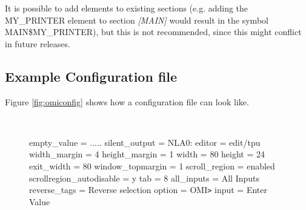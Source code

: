 \documentclass[a4paper]{book}
\newcommand{\vs}{\vspace{3mm}}
\newcommand{\gt}{\texttt{>}}
\renewcommand{\indent}{\hspace*{5mm}}
\begin{document}
\vs

It is possible to add elements to existing sections (e.g. adding the 
\linebreak MY{\_}PRINTER element to section \textsl{[MAIN]} would 
result in the symbol \linebreak MAIN{\$}MY{\_}PRINTER), but this is not recommended,
since this might conflict in future releases.

\subsection{Example Configuration file}
\label{subsubsec:example}

Figure \ref{fig:omiconfig} shows how a configuration file can look like.

\begin{figure}[ht]
\begin{minipage}[t]{\textwidth}
\hrulefill \\
\begin{ttfamily}
\noindent[main] \newline
\indent empty{\_}value = ..... \newline
\indent silent{\_}output = NLA0: \newline
\indent editor = edit/tpu \newline
 \newline
\noindent[screen] \newline
\indent width{\_}margin = 4 \newline
\indent height{\_}margin = 1 \newline
\indent width = 80 \newline
\indent height = 24 \newline
\indent exit{\_}width = 80 \newline
\indent window{\_}topmargin = 1 \newline
\indent scroll{\_}region = enabled \newline
\indent scrollregion{\_}autodisable = y \newline
\indent tab = 8 \newline
 \newline
\noindent[questions] \newline
\indent all{\_}inputs = All Inputs \newline
\indent reverse{\_}tags = Reverse selection \newline
\indent option = OMI\gt  \newline
\indent input = Enter Value \newline

\end{ttfamily}
\end{minipage}
\end{figure}
\end{document}
